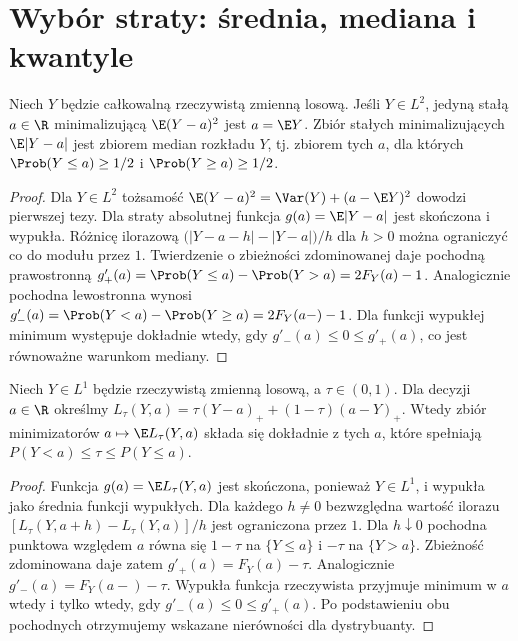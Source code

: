 \section{Wybór straty: średnia, mediana i kwantyle}
\begin{stwierdzenie}
\label{prop:optimal-constant-loss}
Niech $Y$ będzie całkowalną rzeczywistą zmienną losową.
Jeśli $Y\in L^2$, jedyną stałą $a\in\R$ minimalizującą
$\E(Y-a)^2$ jest $a=\E Y$.
Zbiór stałych minimalizujących $\E|Y-a|$ jest zbiorem median
rozkładu $Y$, tj. zbiorem tych $a$, dla których
$\Prob(Y\le a)\ge1/2$ i $\Prob(Y\ge a)\ge1/2$.
\end{stwierdzenie}
\begin{proof}
Dla $Y\in L^2$ tożsamość
$\E(Y-a)^2=\Var(Y)+(a-\E Y)^2$ dowodzi pierwszej tezy.
Dla straty absolutnej funkcja $g(a)=\E|Y-a|$ jest skończona
i wypukła. Różnicę ilorazową
$\bigl(|Y-a-h|-|Y-a|\bigr)/h$ dla $h>0$
można ograniczyć co do modułu przez $1$.
Twierdzenie o zbieżności zdominowanej daje pochodną prawostronną
$g'_+(a)=\Prob(Y\le a)-\Prob(Y>a)=2F_Y(a)-1$.
Analogicznie pochodna lewostronna wynosi
$g'_-(a)=\Prob(Y<a)-\Prob(Y\ge a)=2F_Y(a-)-1$.
Dla funkcji wypukłej minimum występuje dokładnie wtedy, gdy
$g'_-(a)\le0\le g'_+(a)$, co jest równoważne warunkom mediany.
\end{proof}


\begin{stwierdzenie}
\label{prop:pinball-quantile}
Niech $Y\in L^1$ będzie rzeczywistą zmienną losową, a $\tau\in(0,1)$.
Dla decyzji $a\in\R$ określmy
$L_\tau(Y,a)=\tau(Y-a)_++(1-\tau)(a-Y)_+$.
Wtedy zbiór minimizatorów $a\mapsto\E L_\tau(Y,a)$
składa się dokładnie z tych $a$, które spełniają
$P(Y<a)\le\tau\le P(Y\le a)$.
\end{stwierdzenie}
\begin{proof}
Funkcja $g(a)=\E L_\tau(Y,a)$ jest skończona, ponieważ
$Y\in L^1$, i wypukła jako średnia funkcji wypukłych.
Dla każdego $h\ne0$ bezwzględna wartość ilorazu
$[L_\tau(Y,a+h)-L_\tau(Y,a)]/h$ jest ograniczona przez $1$.
Dla $h\downarrow0$ pochodna punktowa względem $a$ równa się
$1-\tau$ na $\{Y\le a\}$ i $-\tau$ na $\{Y>a\}$.
Zbieżność zdominowana daje zatem $g'_+(a)=F_Y(a)-\tau$.
Analogicznie $g'_-(a)=F_Y(a-)-\tau$.
Wypukła funkcja rzeczywista przyjmuje minimum w $a$ wtedy i tylko
wtedy, gdy $g'_-(a)\le0\le g'_+(a)$. Po podstawieniu obu
pochodnych otrzymujemy wskazane nierówności dla dystrybuanty.
\end{proof}

